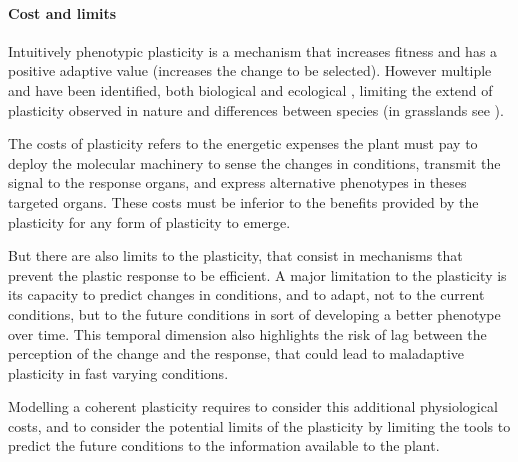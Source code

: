 

\paragraph{Cost and limits}

Intuitively phenotypic plasticity is a mechanism that increases fitness and has a positive adaptive value (increases the change to be selected). However multiple  and  have been identified, both biological \parencite{dewitt_costs_1998, auld_re-evaluating_2009, callahan_phenotypic_2008} and ecological \parencite{dewitt_costs_1998, auld_re-evaluating_2009, scheiner_genetics_1989, scheiner_genetics_2002, scheiner_genetics_2012, van_kleunen_constraints_2005}, limiting the extend of plasticity observed in nature and differences between species (in grasslands see \citet{ryser_consequences_2000}).

The costs of plasticity refers to the energetic expenses the plant must pay to deploy the molecular machinery to sense the changes in conditions, transmit the signal to the response organs, and express alternative phenotypes in theses targeted organs. These costs must be inferior to the benefits provided by the plasticity for any form of plasticity to emerge.

But there are also limits to the plasticity, that consist in mechanisms that prevent the plastic response to be efficient. A major limitation to the plasticity is its capacity to predict changes in conditions, and to adapt, not to the current conditions, but to the future conditions in sort of developing a better phenotype over time. This temporal dimension also highlights the risk of lag between the perception of the change and the response, that could lead to maladaptive plasticity in fast varying conditions.

Modelling a coherent plasticity requires to consider this additional physiological costs, and to consider the potential limits of the plasticity by limiting the tools to predict the future conditions to the information available to the plant.



